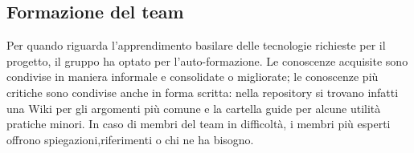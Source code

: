 	\subsection{Formazione del team}
	Per quando riguarda l'apprendimento basilare delle tecnologie richieste per il progetto, il gruppo ha optato per l'auto-formazione. Le conoscenze acquisite sono condivise in maniera informale e consolidate o migliorate; le conoscenze più critiche sono condivise anche in forma scritta: nella repository si trovano infatti una Wiki per gli argomenti più comune e la cartella guide per alcune utilità pratiche minori. In caso di membri del team in difficoltà, i membri più esperti offrono spiegazioni,riferimenti o chi ne ha bisogno.			